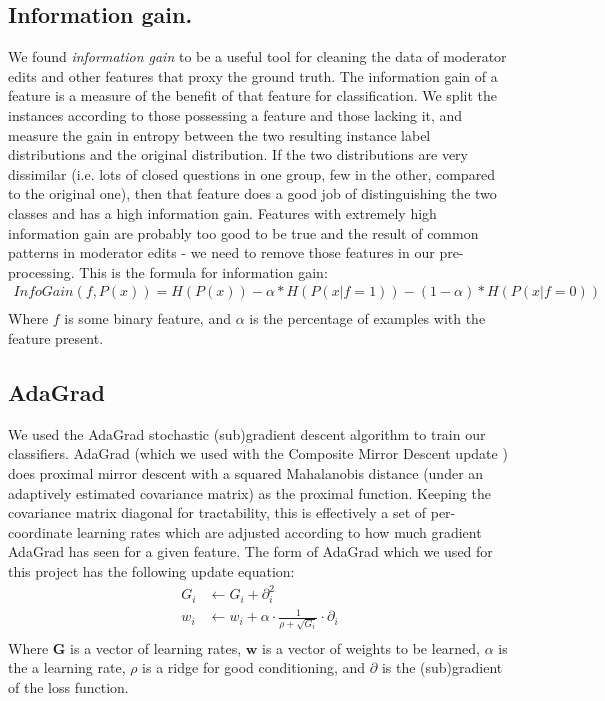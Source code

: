 \documentclass[11pt]{article}
\begin{document}
\subsection*{Information gain.}We found \emph{information gain} \cite{wiki:infogain} to be a useful tool for cleaning the data of moderator edits and other features that proxy the ground truth. The information gain of a feature is a measure of the benefit of that feature for classification. We split the instances according to those possessing a feature and those lacking it, and measure the gain in entropy between the two resulting instance label distributions and the original distribution. If the two distributions are very dissimilar (i.e. lots of closed questions in one group, few in the other, compared to the original one), then that feature does a good job of distinguishing the two classes and has a high information gain. Features with extremely high information gain are probably too good to be true and the result of common patterns in moderator edits - we need to remove those features in our pre-processing. This is the formula for information gain:
\begin{equation*}
\begin{split}
InfoGain(f, P(x)) = H(P(x)) - \alpha*H(P(x|f=1)) - (1 - \alpha)*H(P(x|f=0))\\
\end{split}
\end{equation*}
Where $f$ is some binary feature, and $\alpha$ is the percentage of examples with the feature present.

\subsection*{AdaGrad}We used the AdaGrad \cite{duchi:11a} stochastic (sub)gradient descent algorithm to train our classifiers. AdaGrad (which we used with the Composite Mirror Descent update \cite{duchi:10a}) does proximal mirror descent with a squared Mahalanobis distance (under an adaptively estimated covariance matrix) as the proximal function. Keeping the covariance matrix diagonal for tractability, this is effectively a set of per-coordinate learning rates which are adjusted according to how much gradient AdaGrad has seen for a given feature. The form of AdaGrad which we used for this project has the following update equation:
\begin{equation*}
\begin{split}
G_i &\leftarrow G_i + \partial_i^2\\
w_i &\leftarrow w_i + \alpha \cdot \frac{1}{\rho + \sqrt{G_i}} \cdot \partial_i\\
\end{split}
\end{equation*}
Where $\textbf{G}$ is a vector of learning rates, $\textbf{w}$ is a vector of weights to be learned, $\alpha$ is the a learning rate, $\rho$ is a ridge for good conditioning, and $\partial$ is the (sub)gradient of the loss function.
\end{document}
